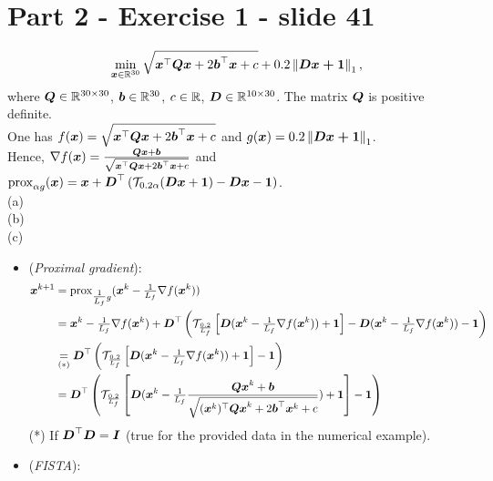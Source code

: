 \section{Part 2 - Exercise 1 - slide 41}
%
\begin{equation*}
    \min_{\boldsymbol x \in \mathbb{R}^{30}} \sqrt{\boldsymbol x^\top \boldsymbol{Qx} + 
    2 \boldsymbol b^\top \boldsymbol x + c} + 0.2 \left\lVert\boldsymbol{Dx+\boldsymbol 1}\right\rVert_{1},
\end{equation*}
%
where $\boldsymbol Q \in \mathbb{R}^{30\times 30}$, $\boldsymbol b\in \mathbb{R}^{30}$, $c\in \mathbb{R}$, $\boldsymbol D
\in \mathbb{R}^{10\times 30}$. The matrix $\boldsymbol Q$ is positive definite. \\
%
One has $f(\boldsymbol x) = \sqrt{\boldsymbol x^\top \boldsymbol{Qx} + 
2 \boldsymbol b^\top \boldsymbol x + c}$ and $g(\boldsymbol x) =  0.2 \left\lVert\boldsymbol{Dx+\boldsymbol 1}\right\rVert_{1}$. \\
Hence, $\nabla f(\boldsymbol x) = \frac{\boldsymbol{Qx}+\boldsymbol b}{\sqrt{\boldsymbol x^\top \boldsymbol{Qx} + 
2 \boldsymbol b^\top \boldsymbol x + c}}$ and $\operatorname{prox}_{\alpha g}(\boldsymbol x) = \boldsymbol x + \boldsymbol D^\top \left( 
\mathcal T_{0.2\alpha} (\boldsymbol{Dx}+\boldsymbol 1) - \boldsymbol{Dx} - \boldsymbol 1 \right)$.
%
\\
\indent (a)  \\
%
\indent (b)  \\
%
\indent (c) 
\begin{itemize}
    \item (\emph{Proximal gradient}):
    \begin{align*}
    \begin{split}
        \boldsymbol x^{k+1} &= \operatorname{prox}_{{\textstyle\frac{1}{L_f}}g} (\boldsymbol x^k - {\textstyle\frac{1}{L_f}} \nabla f(\boldsymbol x^k)) \\ 
        &= \boldsymbol x^k - {\textstyle\frac{1}{L_f}} \nabla f(\boldsymbol x^k) + \boldsymbol D^\top 
        \left( \mathcal T_{\frac{0.2}{L_f}} \left[ \boldsymbol D(\boldsymbol x^k - {\textstyle\frac{1}{L_f}} \nabla 
        f(\boldsymbol x^k) ) + \boldsymbol 1 \right] - \boldsymbol D(\boldsymbol x^k - {\textstyle\frac{1}{L_f}} \nabla 
        f(\boldsymbol x^k) ) - \boldsymbol 1   \right) \\
        &\underset{(*)}{=} \boldsymbol D^\top \left( \mathcal T_{\frac{0.2}{L_f}} \left[ 
        \boldsymbol D(\boldsymbol x^k - {\textstyle\frac{1}{L_f}} \nabla f(\boldsymbol x^k) ) + \boldsymbol 1 \right] - \boldsymbol 1 
        \right) \\
        &= \boldsymbol D^\top \left( \mathcal T_{\frac{0.2}{L_f}} \left[ 
        \boldsymbol D(\boldsymbol x^k - {\textstyle\frac{1}{L_f}} \frac{\boldsymbol{Qx}^k+\boldsymbol b}{\sqrt{(\boldsymbol x^k)^\top 
        \boldsymbol{Qx}^k + 2 \boldsymbol b^\top \boldsymbol x^k + c}} ) + \boldsymbol 1 \right] - \boldsymbol 1 
        \right)
    \end{split}
    \end{align*}
    (*) If $\boldsymbol D^\top \boldsymbol D=\boldsymbol I$ (true for the provided data in the numerical 
    example).
    \item (\emph{FISTA}): \TODO{}
\end{itemize}
%
%
